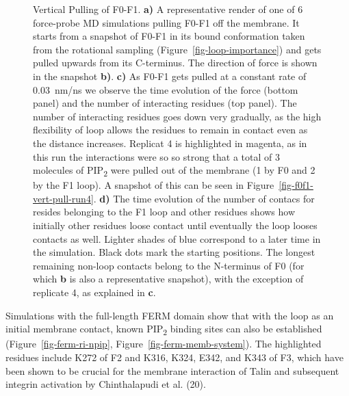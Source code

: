 \documentclass[
  letterpaper,
  DIV=11,
  numbers=noendperiod]{scrartcl}
\begin{document}
\begin{figure}
\begin{minipage}[t]{0.50\linewidth}
\subcaption{\label{fig-f0f1-vert-pull-contacts}~}
\end{minipage}%

\caption{\label{fig-vert-pull}Vertical Pulling of F0-F1. \textbf{a)} A
representative render of one of 6 force-probe MD simulations pulling
F0-F1 off the membrane. It starts from a snapshot of F0-F1 in its bound
conformation taken from the rotational sampling
(Figure~\ref{fig-loop-importance}) and gets pulled upwards from its
C-terminus. The direction of force is shown in the snapshot \textbf{b)}.
\textbf{c)} As F0-F1 gets pulled at a constant rate of 0.03~nm/ns we
observe the time evolution of the force (bottom panel) and the number of
interacting residues (top panel). The number of interacting residues
goes down very gradually, as the high flexibility of loop allows the
residues to remain in contact even as the distance increases. Replicat 4
is highlighted in magenta, as in this run the interactions were so so
strong that a total of 3 molecules of PIP\textsubscript{2} were pulled
out of the membrane (1 by F0 and 2 by the F1 loop). A snapshot of this
can be seen in Figure~\ref{fig-f0f1-vert-pull-run4}. \textbf{d)} The
time evolution of the number of contacs for resides belonging to the F1
loop and other residues shows how initially other residues loose contact
until eventually the loop looses contacts as well. Lighter shades of
blue correspond to a later time in the simulation. Black dots mark the
starting positions. The longest remaining non-loop contacts belong to
the N-terminus of F0 (for which \textbf{b} is also a representative
snapshot), with the exception of replicate 4, as explained in
\textbf{c}.}

\end{figure}

Simulations with the full-length FERM domain show that with the loop as
an initial membrane contact, known PIP\textsubscript{2} binding sites
can also be established
(Figure~\ref{fig-ferm-ri-npip}, Figure~\ref{fig-ferm-memb-system}). The
highlighted residues include K272 of F2 and K316, K324, E342, and K343
of F3, which have been shown to be crucial for the membrane interaction
of Talin and subsequent integrin activation by Chinthalapudi et al.
(20).
\end{document}
